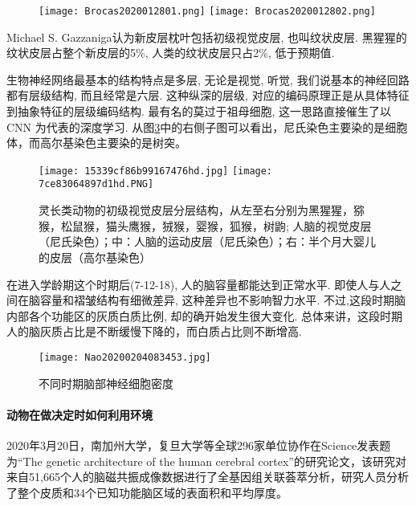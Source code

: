 \begin{itemize}
    \begin{figure}[H]
    \begin{center}
    \quad\quad\quad
    \texttt{[image: Brocas2020012801.png]}
    \texttt{[image: Brocas2020012802.png]}
    \end{center}
    \label{Brocas2020012801}
    \end{figure}
      Michael S. Gazzaniga认为新皮层枕叶包括初级视觉皮层, 也叫纹状皮层. 黑猩猩的纹状皮层占整个新皮层的5\%, 人类的纹状皮层只占2\%, 低于预期值.

      生物神经网络最基本的结构特点是多层, 无论是视觉, 听觉, 我们说基本的神经回路都有层级结构, 而且经常是六层. 这种纵深的层级, 对应的编码原理正是从具体特征到抽象特征的层级编码结构.
      最有名的莫过于祖母细胞, 这一思路直接催生了以 CNN 为代表的深度学习. 从图\ref{Glutamine013001}中的右侧子图可以看出，尼氏染色主要染的是细胞体，而高尔基染色主要染的是树突。
    \begin{figure}[H]
    \begin{center}\quad
    \texttt{[image: 15339cf86b99167476hd.jpg]}
    \texttt{[image: 7ce83064897d1hd.PNG]}
    \end{center}
    \caption{灵长类动物的初级视觉皮层分层结构，从左至右分别为黑猩猩，猕猴，松鼠猴，猫头鹰猴，狨猴，婴猴，狐猴，树鼩; 人脑的视觉皮层（尼氏染色）；中：人脑的运动皮层（尼氏染色）；右：半个月大婴儿的皮层（高尔基染色）}
    \label{Glutamine013001}
    \end{figure}

在进入学龄期这个时期后(7-12-18), 人的脑容量都能达到正常水平. 即使人与人之间在脑容量和褶皱结构有细微差异, 这种差异也不影响智力水平. 不过,这段时期脑内部各个功能区的灰质白质比例, 却的确开始发生很大变化.
总体来讲，这段时期人的脑灰质占比是不断缓慢下降的，而白质占比则不断增高.
    \begin{figure}[H]
    \begin{center}\quad
    \texttt{[image: Nao20200204083453.jpg]}
    \end{center}
    \caption{不同时期脑部神经细胞密度}
    \label{Glutamine013001}
    \end{figure}
\paragraph{动物在做决定时如何利用环境}

2020年3月20日，南加州大学，复旦大学等全球296家单位协作在Science发表题为“The genetic architecture of the human cerebral cortex”的研究论文，该研究对来自51,665个人的脑磁共振成像数据进行了全基因组关联荟萃分析，研究人员分析了整个皮质和34个已知功能脑区域的表面积和平均厚度。


\end{itemize}
